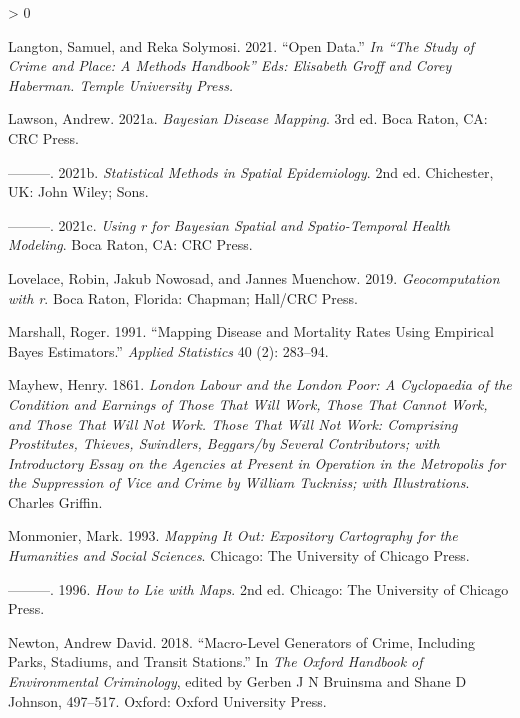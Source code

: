 \documentclass[
]{book}
\newlength{\cslhangindent}
\newenvironment{CSLReferences}[2] %
 {%
  \setlength{\parindent}{0pt}
  \ifodd #1 \everypar{\setlength{\hangindent}{\cslhangindent}}\ignorespaces\fi
  \ifnum #2 > 0
  \setlength{\parskip}{#2\baselineskip}
  \fi
 }%
 {}
\begin{document}
\begin{CSLReferences}{1}{0}
\leavevmode\hypertarget{ref-Langton_2019}{}%
Langton, Samuel, and Reka Solymosi. 2021. {``Open Data.''} \emph{In {``The Study of Crime and Place: A Methods Handbook''} Eds: Elisabeth Groff and Corey Haberman. Temple University Press.}

\leavevmode\hypertarget{ref-Lawson_2021a}{}%
Lawson, Andrew. 2021a. \emph{Bayesian Disease Mapping}. 3rd ed. Boca Raton, CA: CRC Press.

\leavevmode\hypertarget{ref-Lawson_2006}{}%
---------. 2021b. \emph{Statistical Methods in Spatial Epidemiology}. 2nd ed. Chichester, UK: John Wiley; Sons.

\leavevmode\hypertarget{ref-Lawson_2021b}{}%
---------. 2021c. \emph{Using r for Bayesian Spatial and Spatio-Temporal Health Modeling}. Boca Raton, CA: CRC Press.

\leavevmode\hypertarget{ref-Lovelace_2019}{}%
Lovelace, Robin, Jakub Nowosad, and Jannes Muenchow. 2019. \emph{Geocomputation with r}. Boca Raton, Florida: Chapman; Hall/CRC Press.

\leavevmode\hypertarget{ref-Marshall_1991}{}%
Marshall, Roger. 1991. {``Mapping Disease and Mortality Rates Using Empirical Bayes Estimators.''} \emph{Applied Statistics} 40 (2): 283--94.

\leavevmode\hypertarget{ref-Mayhew_1861}{}%
Mayhew, Henry. 1861. \emph{London Labour and the London Poor: A Cyclopaedia of the Condition and Earnings of Those That Will Work, Those That Cannot Work, and Those That Will Not Work. Those That Will Not Work: Comprising Prostitutes, Thieves, Swindlers, Beggars/by Several Contributors; with Introductory Essay on the Agencies at Present in Operation in the Metropolis for the Suppression of Vice and Crime by William Tuckniss; with Illustrations}. Charles Griffin.

\leavevmode\hypertarget{ref-Monmonier_1993}{}%
Monmonier, Mark. 1993. \emph{Mapping It Out: Expository Cartography for the Humanities and Social Sciences}. Chicago: The University of Chicago Press.

\leavevmode\hypertarget{ref-Monmonier_1996}{}%
---------. 1996. \emph{How to Lie with Maps}. 2nd ed. Chicago: The University of Chicago Press.

\leavevmode\hypertarget{ref-Newton_2018}{}%
Newton, Andrew David. 2018. {``Macro-Level Generators of Crime, Including Parks, Stadiums, and Transit Stations.''} In \emph{The Oxford Handbook of Environmental Criminology}, edited by Gerben J N Bruinsma and Shane D Johnson, 497--517. Oxford: Oxford University Press.


\end{CSLReferences}
\end{document}
